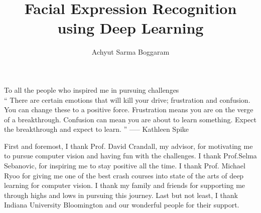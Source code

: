 \documentclass{iuthesis}
\begin{document}

\title{Facial Expression Recognition using Deep Learning}
\author{Achyut Sarma Boggaram}




\maketitle
\approvalpage
\copyrightpage



\begin{frontmatter}

\begin{dedication}
\null\vfil
\begin{center}
To all the people who inspired me in pursuing challenges\\\vspace{12pt}
`` There are certain emotions that will kill your drive; frustration and confusion. You can change these to a positive force. Frustration means you are on the verge of a breakthrough. Confusion can mean you are about to learn something. Expect the breakthrough and expect to learn. '' —-- Kathleen Spike
\end{center}
\vfil\null
\end{dedication}

\tableofcontents
\clearpage
\listoffigures
\clearpage
\listoftables

\begin{acknowledgements}
First and foremost, I thank Prof. David Crandall, my advisor, for motivating me to pursue computer vision and having fun with the challenges. I thank Prof.Selma Sebanovic, for inspiring me to stay positive all the time. I thank Prof. Michael Ryoo for giving me one of the best crash courses into state of the arts of deep learning for computer vision. I thank my family and friends for supporting me through highs and lows in pursuing this journey. Last but not least, I thank Indiana University Bloomington and our wonderful people for their support.
\end{acknowledgements}

\end{frontmatter}
\end{document}
